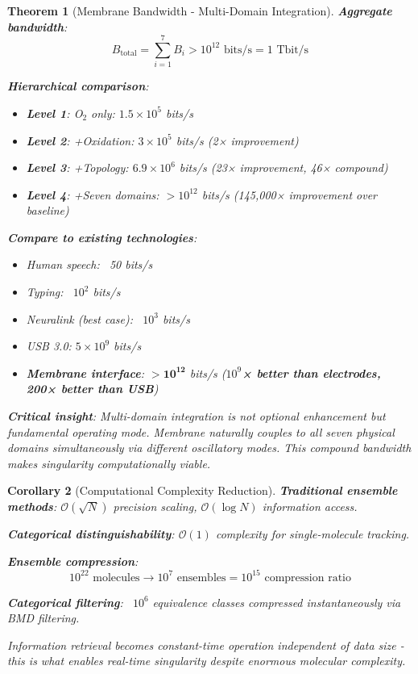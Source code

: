 \documentclass[11pt,a4paper]{article}
\newtheorem{theorem}{Theorem}[section]
\newtheorem{corollary}[theorem]{Corollary}
\theoremstyle{definition}
\theoremstyle{remark}
\begin{document}
\begin{theorem}[Membrane Bandwidth - Multi-Domain Integration]
\textbf{Aggregate bandwidth}:
\begin{equation}
B_{\text{total}} = \sum_{i=1}^7 B_i > 10^{12} \text{ bits/s} = 1 \text{ Tbit/s}
\end{equation}

\textbf{Hierarchical comparison}:
\begin{itemize}
\item \textbf{Level 1}: O$_2$ only: $1.5 \times 10^5$ bits/s
\item \textbf{Level 2}: +Oxidation: $3 \times 10^5$ bits/s (2× improvement)
\item \textbf{Level 3}: +Topology: $6.9 \times 10^6$ bits/s (23× improvement, 46× compound)
\item \textbf{Level 4}: +Seven domains: $> 10^{12}$ bits/s (145,000× improvement over baseline)
\end{itemize}

\textbf{Compare to existing technologies}:
\begin{itemize}
\item Human speech: ~50 bits/s
\item Typing: ~$10^2$ bits/s
\item Neuralink (best case): ~$10^3$ bits/s
\item USB 3.0: $5 \times 10^9$ bits/s
\item \textbf{Membrane interface}: $\mathbf{> 10^{12}}$ bits/s (\textbf{$10^9$× better than electrodes, 200× better than USB})
\end{itemize}

\textbf{Critical insight}: Multi-domain integration is not optional enhancement but \textit{fundamental operating mode}. Membrane naturally couples to all seven physical domains simultaneously via different oscillatory modes. This compound bandwidth makes singularity computationally viable.
\end{theorem}

\begin{corollary}[Computational Complexity Reduction]
\textbf{Traditional ensemble methods}: $\mathcal{O}(\sqrt{N})$ precision scaling, $\mathcal{O}(\log N)$ information access.

\textbf{Categorical distinguishability}: $\mathcal{O}(1)$ complexity for single-molecule tracking.

\textbf{Ensemble compression}:
\begin{equation}
10^{22} \text{ molecules} \rightarrow 10^7 \text{ ensembles} = 10^{15} \text{ compression ratio}
\end{equation}

\textbf{Categorical filtering}: ~$10^6$ equivalence classes compressed instantaneously via BMD filtering.

Information retrieval becomes \textit{constant-time operation} independent of data size - this is what enables real-time singularity despite enormous molecular complexity.
\end{corollary}
\end{document}
